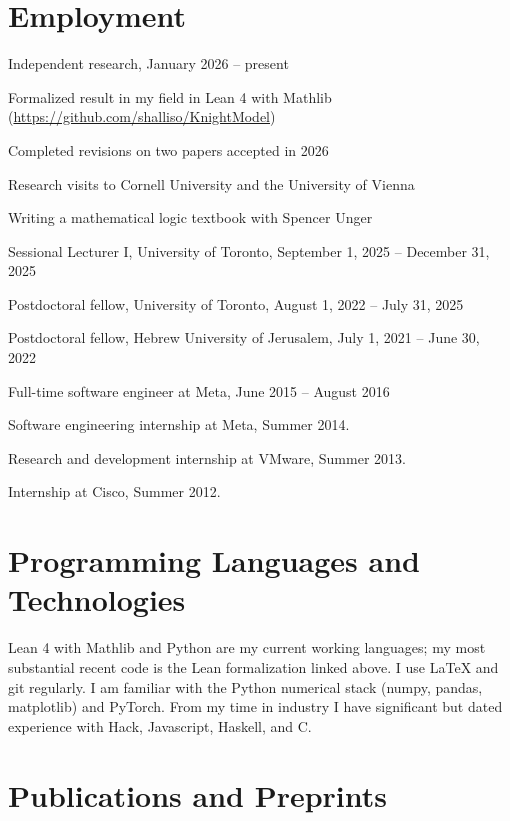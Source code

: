 \documentclass[letterpaper]{article}
\renewenvironment{itemize}{
  \begin{list}{}{
    \setlength{\leftmargin}{1.5em}
  }
}{
  \end{list}
}
\begin{document}
\section*{Employment}
\begin{itemize}
  \item Independent research, January 2026 -- present
  \begin{itemize}
      \item Formalized result in my field in Lean 4 with Mathlib (\url{https://github.com/shalliso/KnightModel})
      \item Completed revisions on two papers accepted in 2026
      \item Research visits to Cornell University and the University of Vienna
      \item Writing a mathematical logic textbook with Spencer Unger
  \end{itemize}
  \item Sessional Lecturer I, University of Toronto, September 1, 2025 -- December 31, 2025
  \item Postdoctoral fellow, University of Toronto, August 1, 2022 -- July 31, 2025
  \item Postdoctoral fellow, Hebrew University of Jerusalem, July 1, 2021 -- June 30, 2022
  \item Full-time software engineer at Meta, June 2015 -- August 2016
  \item Software engineering internship at Meta, Summer 2014.
  \item Research and development internship at VMware, Summer 2013.
  \item Internship at Cisco, Summer 2012.
\end{itemize}

\section*{Programming Languages and Technologies}

Lean 4 with Mathlib and Python are my current working languages; my most substantial recent code is the Lean formalization linked above. I use LaTeX and git regularly. I am familiar with the Python numerical stack (numpy, pandas, matplotlib) and PyTorch. From my time in industry I have significant but dated experience with Hack, Javascript, Haskell, and C.


\section*{Publications and Preprints}
\end{document}

